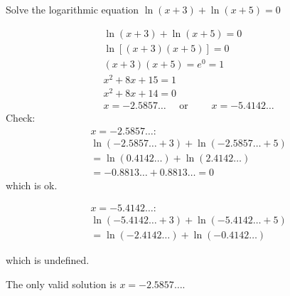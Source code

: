 \begin{example} Solve the logarithmic equation $\ln (x+3)+\ln (x+5)=0$

\begin{solution}
    \[
\begin{aligned}
& \ln (x+3)+\ln (x+5)=0 \\
& \ln [(x+3)(x+5)]=0 \\
& (x+3)(x+5)=e^0=1 \\
& x^2+8 x+15=1 \\
& x^2+8 x+14=0 \\
& x=-2.5857 \ldots \quad \text { or } \qquad x=-5.4142 \ldots
\end{aligned}
\]
Check:
\[
\begin{aligned}
& x=-2.5857 \ldots: \\
& \ln (-2.5857 \ldots+3)+\ln (-2.5857 \ldots+5) \\
& =\ln (0.4142 \ldots)+\ln (2.4142 \ldots) \\
& =-0.8813 \ldots+0.8813 \ldots=0
\end{aligned}
\]
which is ok.

\[
\begin{aligned}
& x=-5.4142 \ldots: \\
& \ln (-5.4142 \ldots+3)+\ln (-5.4142 \ldots+5) \\
& =\ln (-2.4142 \ldots)+\ln (-0.4142 \ldots)
\end{aligned}
\]

which is undefined.

The only valid solution is $x=-2.5857 \ldots$.
\end{solution}
    
\end{example}

